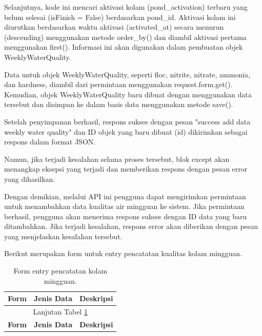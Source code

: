 \begin{enumerate}[1.]
Selanjutnya, kode ini mencari aktivasi kolam (pond\_activation) terbaru yang belum selesai (isFinish = False) berdasarkan pond\_id. Aktivasi kolam ini diurutkan berdasarkan waktu aktivasi (activated\_at) secara menurun (descending) menggunakan metode order\_by() dan diambil aktivasi pertama menggunakan first(). Informasi ini akan digunakan dalam pembuatan objek WeeklyWaterQuality.

Data untuk objek WeeklyWaterQuality, seperti floc, nitrite, nitrate, ammonia, dan hardness, diambil dari permintaan menggunakan request.form.get(). Kemudian, objek WeeklyWaterQuality baru dibuat dengan menggunakan data tersebut dan disimpan ke dalam basis data menggunakan metode save().

Setelah penyimpanan berhasil, respons sukses dengan pesan "success add data weekly water quality" dan ID objek yang baru dibuat (id) dikirimkan sebagai respons dalam format JSON.

Namun, jika terjadi kesalahan selama proses tersebut, blok except akan menangkap eksepsi yang terjadi dan memberikan respons dengan pesan error yang dihasilkan.

Dengan demikian, melalui API ini pengguna dapat mengirimkan permintaan untuk menambahkan data kualitas air mingguan ke sistem. Jika permintaan berhasil, pengguna akan menerima respons sukses dengan ID data yang baru ditambahkan. Jika terjadi kesalahan, respons error akan diberikan dengan pesan yang menjelaskan kesalahan tersebut.

Berikut merupakan form untuk entry pencatatan kualitas kolam mingguan.

\begin{longtable}{| l | p{5cm} | p{5cm} |}
\caption{Form entry pencatatan kolam mingguan.\label{table:form_entry_pencatatan_kolam_mingguan}}\\

\hline
\multicolumn{1}{|c|}{\textbf{Form}} & \multicolumn{1}{|c|}{\textbf{Jenis Data}} & \multicolumn{1}{|c|}{\textbf{Deskripsi}}\\
\hline
\endfirsthead

\hline
\multicolumn{3}{|c|}{Lanjutan Tabel \ref{table:form_entry_pencatatan_kolam_mingguan}}\\
\hline
\multicolumn{1}{|c|}{\textbf{Form}} & \multicolumn{1}{|c|}{\textbf{Jenis Data}} & \multicolumn{1}{|c|}{\textbf{Deskripsi}}\\
\hline
\endhead

                                          


\end{longtable}
\end{enumerate}

